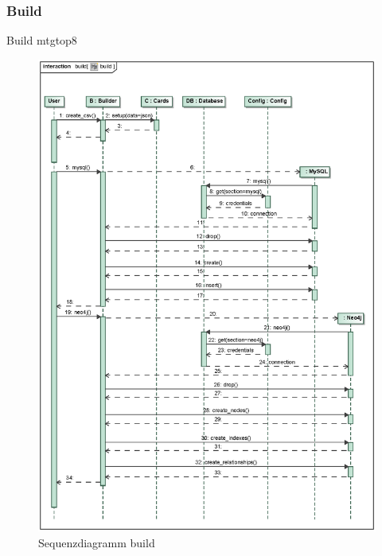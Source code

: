 \subsubsection{Build} %
Build mtgtop8 %

\begin{figure}[H]
    \myfloatalign
    \includegraphics[width=\textwidth]{gfx/MtGDeepAnalysis/build.eps}
    \caption{Sequenzdiagramm build} %
    \label{fig:seq:build}
\end{figure}